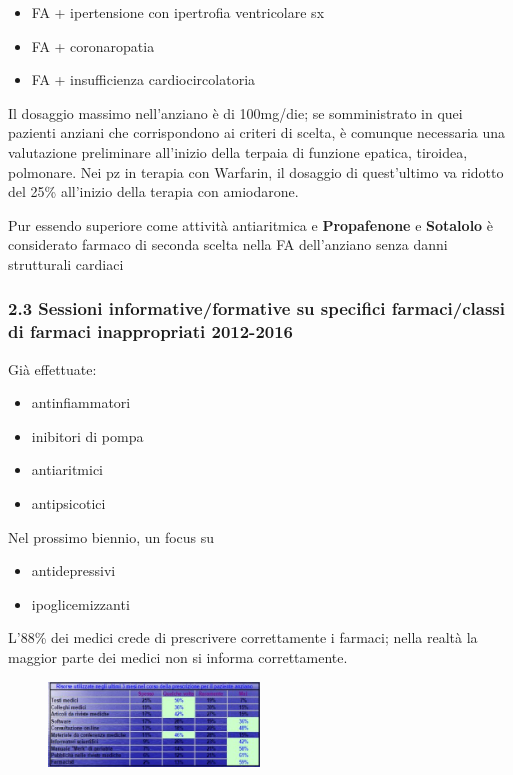 \begin{itemize}
\item
  FA + ipertensione con ipertrofia ventricolare sx
\item
  FA + coronaropatia
\item
  FA + insufficienza cardiocircolatoria
\end{itemize}

  Il dosaggio massimo nell'anziano è di 100mg/die; se somministrato in
  quei pazienti anziani che corrispondono ai criteri di scelta, è
  comunque necessaria una valutazione preliminare all'inizio della
  terpaia di funzione epatica, tiroidea, polmonare. Nei pz in terapia
  con Warfarin, il dosaggio di quest'ultimo va ridotto del 25\%
  all'inizio della terapia con amiodarone.

  Pur essendo superiore come attività antiaritmica e
  \textbf{Propafenone} e \textbf{Sotalolo} è considerato farmaco di
  seconda scelta nella FA dell'anziano senza danni strutturali cardiaci

  \subsubsection{2.3 Sessioni informative/formative su specifici farmaci/classi di farmaci inappropriati 2012-2016}
  Già effettuate:
  
\begin{itemize}
\item antinfiammatori
\item inibitori di pompa
\item antiaritmici
\item antipsicotici
\end{itemize}

  Nel prossimo biennio, un focus su
  
\begin{itemize}
\item antidepressivi
\item ipoglicemizzanti
\end{itemize}

  L'88\% dei medici crede di prescrivere correttamente i farmaci; nella
  realtà la maggior parte dei medici non si informa correttamente.

  \begin{figure}[!ht]
\centering
	\includegraphics[width=0.5\textwidth]{37/image4.jpg}
	\end{figure}

